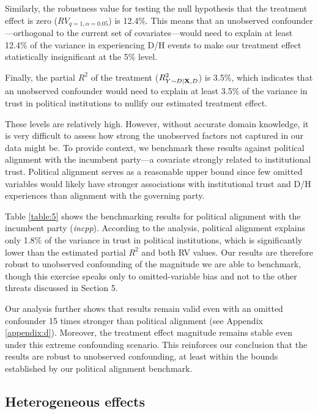 \documentclass{article}
\begin{document}
Similarly, the robustness value for testing the null hypothesis that the treatment effect is zero ($RV_{q = 1, \alpha = 0.05}$) is 12.4\%. This means that an unobserved confounder—orthogonal to the current set of covariates—would need to explain at least 12.4\% of the variance in experiencing D/H events to make our treatment effect statistically insignificant at the 5\% level.

Finally, the partial $R^2$ of the treatment ($R^2_{Y\sim D| {\bf X}, D}$) is 3.5\%, which indicates that an unobserved confounder would need to explain at least 3.5\% of the variance in trust in political institutions to nullify our estimated treatment effect.

These levels are relatively high. However, without accurate domain knowledge, it is very difficult to assess how strong the unobserved factors not captured in our data might be. To provide context, we benchmark these results against political alignment with the incumbent party—a covariate strongly related to institutional trust. Political alignment serves as a reasonable upper bound since few omitted variables would likely have stronger associations with institutional trust and D/H experiences than alignment with the governing party.

Table \ref{table:5} shows the benchmarking results for political alignment with the incumbent party (\emph{incpp}). According to the analysis, political alignment explains only 1.8\% of the variance in trust in political institutions, which is significantly lower than the estimated partial $R^2$ and both RV values. Our results are therefore robust to unobserved confounding of the magnitude we are able to benchmark, though this exercise speaks only to omitted-variable bias and not to the other threats discussed in Section 5.



Our analysis further shows that results remain valid even with an omitted confounder 15 times stronger than political alignment (see Appendix \ref{appendix:d}). Moreover, the treatment effect magnitude remains stable even under this extreme confounding scenario. This reinforces our conclusion that the results are robust to unobserved confounding, at least within the bounds established by our political alignment benchmark.

\subsection{Heterogeneous effects}
\end{document}
